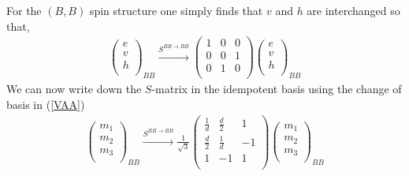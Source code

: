 For the $(B,B)$ spin structure one simply finds that $v$ and $h$ are interchanged so that,
\begin{align}
\left( \begin{matrix}
e\\
v\\
h\\
\end{matrix} \right)_{BB}
\xrightarrow{S^{BB \rightarrow BB}}
\left(\begin{matrix}
1& 0& 0 \\
0& 0&1  \\
0&1 &0 \\ 
\end{matrix} \right)
\left( \begin{matrix}
e\\
v\\
h\\
\end{matrix} \right)_{BB}
\end{align}
We can now write down the $S$-matrix in the idempotent basis using the change of basis in (\ref{VAA})
\begin{align}
\left( \begin{matrix}
m_1\\
m_2\\
m_3\\
\end{matrix} \right)_{BB} \xrightarrow{S^{BB \rightarrow BB}} 
\frac{1}{\sqrt{3}}\left( \begin{matrix}
\frac{1}{d} & \frac{d}{2} & 1\\ 
\frac{d}{2} & \frac{1}{d} & -1\\
1 & -1 & 1\\
\end{matrix} \right)
\left( \begin{matrix}
m_1\\
m_2\\
m_3\\
\end{matrix} \right)_{BB}
\end{align}

